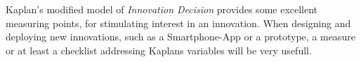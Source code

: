 \documentclass[journal]{IEEEtran}
\begin{document}
Kaplan's modified model of \textit{Innovation Decision} provides some excellent measuring points, for stimulating interest in an innovation. When designing and deploying new innovations, such as a Smartphone-App or a prototype, a measure or at least a checklist addressing Kaplans variables will be very usefull.




\newpage


%
%
%
\end{document}
